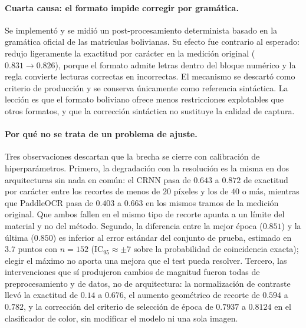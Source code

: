\paragraph{Cuarta causa: el formato impide corregir por gramática.}
Se implementó y se midió un post-procesamiento determinista basado en la
gramática oficial de las matrículas bolivianas. Su efecto fue contrario al
esperado: redujo ligeramente la exactitud por carácter en la medición original
($0{.}831 \rightarrow 0{.}826$), porque el formato admite letras dentro del bloque
numérico y la regla convierte lecturas correctas en incorrectas. El mecanismo se
descartó como criterio de producción y se conserva únicamente como referencia
sintáctica. La lección es que el formato boliviano ofrece menos restricciones
explotables que otros formatos, y que la corrección sintáctica no sustituye la
calidad de captura.

\paragraph{Por qué no se trata de un problema de ajuste.}
Tres observaciones descartan que la brecha se cierre con calibración de
hiperparámetros. Primero, la degradación con la resolución es la misma en dos
arquitecturas sin nada en común: el CRNN pasa de $0{.}643$ a $0{.}872$ de exactitud
por carácter entre los recortes de menos de $20$ píxeles y los de $40$ o más,
mientras que PaddleOCR pasa de $0{.}403$ a $0{.}663$ en los mismos tramos de la
medición original. Que ambos fallen en el mismo tipo de recorte apunta a un límite
del material y no del método. Segundo, la diferencia entre la mejor época
($0{.}851$) y la última ($0{.}850$) es inferior al error estándar del conjunto de
prueba, estimado en $3{.}7$ puntos con $n = 152$ ($\mathrm{IC}_{95} \approx \pm 7$
sobre la probabilidad de coincidencia exacta); elegir el máximo no aporta una
mejora que el test pueda resolver. Tercero, las intervenciones que sí produjeron
cambios de magnitud fueron todas de preprocesamiento y de datos, no de
arquitectura: la normalización de contraste llevó la exactitud de $0{.}14$ a
$0{.}676$, el aumento geométrico de recorte de $0{.}594$ a $0{.}782$, y la
corrección del criterio de selección de época de $0{.}7937$ a $0{.}8124$ en el
clasificador de color, sin modificar el modelo ni una sola imagen.

